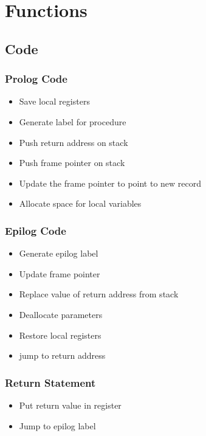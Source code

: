 \documentclass[usepdftitle=false,professionalfonts,compress ]{beamer}
\begin{document}
\section{Functions}
		
\subsection{Code}

{
\begin{frame}\frametitle{Prolog Code}

	\begin{itemize}
	\item Save local registers
			\item Generate label for procedure
			\item Push return address on stack
			\item Push frame pointer on stack
			\item Update the frame pointer to point to new record
			\item Allocate space for local variables
				\end{itemize}

\end{frame}}








{
\begin{frame}\frametitle{Epilog Code}

	\begin{itemize}
	\item Generate epilog label
			\item Update frame pointer
			\item Replace value of return address from stack
			\item Deallocate parameters
			\item Restore local registers
			\item jump to return address
				\end{itemize}

\end{frame}}








{
\begin{frame}\frametitle{Return Statement}

	\begin{itemize}
	\item Put return value in register
			\item Jump to epilog label
				\end{itemize}

\end{frame}}
\end{document}
